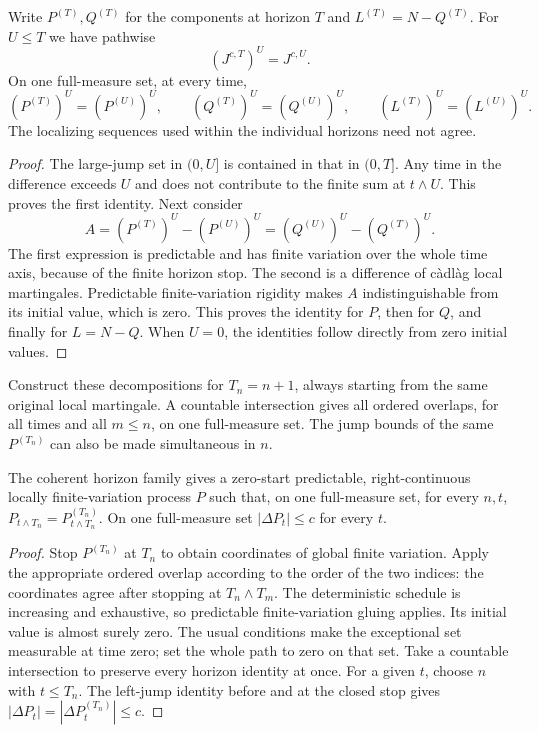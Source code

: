 \begin{lemma}
Write $P^{(T)},Q^{(T)}$ for the components at horizon $T$ and
$L^{(T)}=N-Q^{(T)}$. For $U\leq T$ we have pathwise
\[
 (J^{c,T})^U=J^{c,U}.
\]
On one full-measure set, at every time,
\[
 (P^{(T)})^U=(P^{(U)})^U,\qquad
 (Q^{(T)})^U=(Q^{(U)})^U,\qquad
 (L^{(T)})^U=(L^{(U)})^U.
\]
The localizing sequences used within the individual horizons need not agree.
\end{lemma}
\begin{proof}
The large-jump set in $(0,U]$ is contained in that in $(0,T]$.
Any time in the difference exceeds $U$ and does not contribute to the
finite sum at $t\wedge U$. This proves the first identity. Next consider
\[
 A=(P^{(T)})^U-(P^{(U)})^U
   =(Q^{(U)})^U-(Q^{(T)})^U.
\]
The first expression is predictable and has finite variation over the
whole time axis, because of the finite horizon stop. The second is a
difference of c\`adl\`ag local martingales. Predictable finite-variation
rigidity makes $A$ indistinguishable from its initial value, which is zero.
This proves the identity for $P$, then for $Q$, and finally for $L=N-Q$.
When $U=0$, the identities follow directly from zero initial values.
\end{proof}
Construct these decompositions for $T_n=n+1$, always starting from the
same original local martingale. A countable intersection gives all ordered
overlaps, for all times and all $m\leq n$, on one full-measure set.
The jump bounds of the same $P^{(T_n)}$ can also be made simultaneous in $n$.

\begin{lemma}
The coherent horizon family gives a zero-start predictable,
right-continuous locally finite-variation process $P$ such that, on one
full-measure set, for every $n,t$,
$P_{t\wedge T_n}=P^{(T_n)}_{t\wedge T_n}$.
On one full-measure set $|\Delta P_t|\leq c$ for every $t$.
\end{lemma}
\begin{proof}
Stop $P^{(T_n)}$ at $T_n$ to obtain coordinates of global finite variation.
Apply the appropriate ordered overlap according to the order of the two
indices: the coordinates agree after stopping at $T_n\wedge T_m$.
The deterministic schedule is increasing and exhaustive, so predictable
finite-variation gluing applies. Its initial value is almost surely zero.
The usual conditions make the exceptional set measurable at time zero;
set the whole path to zero on that set.
Take a countable intersection to preserve every horizon identity at once.
For a given $t$, choose $n$ with $t\leq T_n$. The left-jump identity before
and at the closed stop gives
$|\Delta P_t|=|\Delta P^{(T_n)}_t|\leq c$.
\end{proof}

